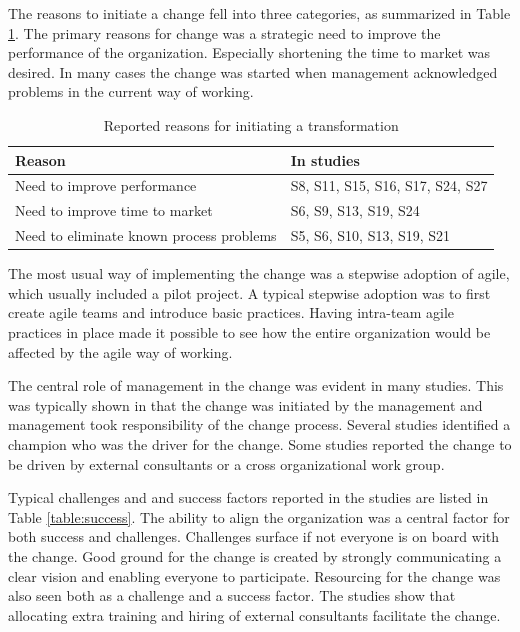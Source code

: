 \documentclass[lnbip]{svmultln}
\begin{document}
The reasons to initiate a change fell into three categories, as summarized in
Table \ref{table:motivations}. The primary reasons for change was a strategic
need to improve the performance of the organization. Especially shortening the
time to market was desired. In many cases the change was started when management
acknowledged problems in the current way of working.

\begin{table}[t]
    \begin{tabular}{ l@{ \hskip 0.4cm } l }
        \toprule
        Reason                                    & In studies   \\ \midrule
        Need to improve performance               & S8, S11, S15, S16, S17, S24, S27 \\ 
        Need to improve time to market            & S6, S9, S13, S19, S24 \\
        Need to eliminate known process problems  & S5, S6, S10, S13, S19, S21 \\
        \bottomrule
    \end{tabular}
    \caption{Reported reasons for initiating a transformation}
    \label{table:motivations}
\end{table}


The most usual way of implementing the change was a stepwise adoption of agile,
which usually included a pilot project. A typical stepwise adoption was to first
create agile teams and introduce basic practices. Having intra-team agile
practices in place made it possible to see how the entire organization would be
affected by the agile way of working.

The central role of management in the change was evident in many studies. This
was typically shown in that the change was initiated by the management and
management took responsibility of the change process. Several studies identified
a champion who was the driver for the change. Some studies reported the change to
be driven by external consultants or a cross organizational work group.

Typical challenges and and success factors reported in the studies are listed in
Table \ref{table:success}. The ability to align the organization was a central
factor for both success and challenges. Challenges surface if not everyone is on
board with the change. Good ground for the change is created by strongly
communicating a clear vision and enabling everyone to participate. Resourcing
for the change was also seen both as a challenge and a success factor.
The studies show that allocating extra training and hiring of external
consultants facilitate the change.
\end{document}
